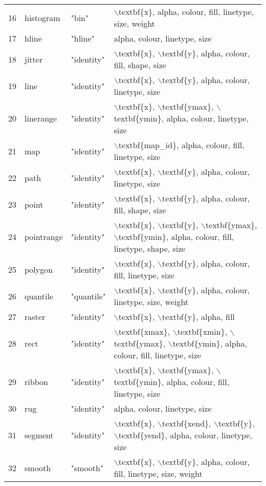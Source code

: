 \begin{table}[ht]
\begin{tabular}{rlll}
  16 & histogram & "bin" & $\backslash$textbf\{x\}, alpha, colour, fill, linetype, size, weight \\ 
  17 & hline & "hline" & alpha, colour, linetype, size \\ 
  18 & jitter & "identity" & $\backslash$textbf\{x\}, $\backslash$textbf\{y\}, alpha, colour, fill, shape, size \\ 
  19 & line & "identity" & $\backslash$textbf\{x\}, $\backslash$textbf\{y\}, alpha, colour, linetype, size \\ 
  20 & linerange & "identity" & $\backslash$textbf\{x\}, $\backslash$textbf\{ymax\}, $\backslash$textbf\{ymin\}, alpha, colour, linetype, size \\ 
  21 & map & "identity" & $\backslash$textbf\{map\_id\}, alpha, colour, fill, linetype, size \\ 
  22 & path & "identity" & $\backslash$textbf\{x\}, $\backslash$textbf\{y\}, alpha, colour, linetype, size \\ 
  23 & point & "identity" & $\backslash$textbf\{x\}, $\backslash$textbf\{y\}, alpha, colour, fill, shape, size \\ 
  24 & pointrange & "identity" & $\backslash$textbf\{x\}, $\backslash$textbf\{y\}, $\backslash$textbf\{ymax\}, $\backslash$textbf\{ymin\}, alpha, colour, fill, linetype, shape, size \\ 
  25 & polygon & "identity" & $\backslash$textbf\{x\}, $\backslash$textbf\{y\}, alpha, colour, fill, linetype, size \\ 
  26 & quantile & "quantile" & $\backslash$textbf\{x\}, $\backslash$textbf\{y\}, alpha, colour, linetype, size, weight \\ 
  27 & raster & "identity" & $\backslash$textbf\{x\}, $\backslash$textbf\{y\}, alpha, fill \\ 
  28 & rect & "identity" & $\backslash$textbf\{xmax\}, $\backslash$textbf\{xmin\}, $\backslash$textbf\{ymax\}, $\backslash$textbf\{ymin\}, alpha, colour, fill, linetype, size \\ 
  29 & ribbon & "identity" & $\backslash$textbf\{x\}, $\backslash$textbf\{ymax\}, $\backslash$textbf\{ymin\}, alpha, colour, fill, linetype, size \\ 
  30 & rug & "identity" & alpha, colour, linetype, size \\ 
  31 & segment & "identity" & $\backslash$textbf\{x\}, $\backslash$textbf\{xend\}, $\backslash$textbf\{y\}, $\backslash$textbf\{yend\}, alpha, colour, linetype, size \\ 
  32 & smooth & "smooth" & $\backslash$textbf\{x\}, $\backslash$textbf\{y\}, alpha, colour, fill, linetype, size, weight \\ 

\end{tabular}
\end{table}

